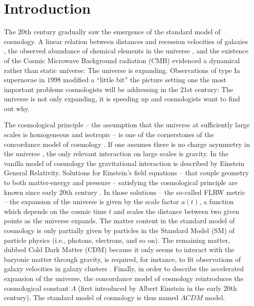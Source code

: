 \chapter*{Introduction}
\label{intro} 

The $20$th century gradually saw the emergence of the standard model of cosmology. A linear relation between distances and recession velocities of galaxies \cite{Hubble:1929ig}, the observed abundance of chemical elements in the universe , and the existence of the Cosmic Microwave Background radiation (CMB)  evidenced a dynamical rather than static universe: The universe is expanding. Observations of type Ia supernovae in $1998$  modified a ``little bit'' the picture setting one the most important problems cosmologists will be addressing in the $21$st century: The universe is not only expanding, it is speeding up and cosmologists want to find out why. 

The cosmological principle -- the assumption that the universe at sufficiently large scales is homogeneous and isotropic -- is one of the cornerstones of the concordance model of cosmology . If one assumes there is no charge asymmetry in the universe , the only relevant interaction on large scales is gravity. In the vanilla model of cosmology the gravitational interaction is described by Einstein General Relativity. Solutions for Einstein's field equations -- that couple geometry to both matter-energy and pressure -- satisfying the cosmological principle are known since early $20$th century . In those solutions -- the so-called FLRW metric -- the expansion of the universe is given by the scale factor $a(t)$, a function which depends on the cosmic time $t$ and scales the distance between two given points as the universe expands. The matter content in the standard model of cosmology is only partially given by particles in the Standard Model (SM) of particle physics (i.e., photons, electrons, and so on). The remaining matter, dubbed Cold Dark Matter (CDM) because it only seems to interact with the baryonic matter through gravity, is required, for instance, to fit observations of galaxy velocities in galaxy clusters . Finally, in order to describe the accelerated expansion of the universe, the concordance model of cosmology reintroduces the cosmological constant $\Lambda$ (first introduced by Albert Einstein in the early $20$th century). The standard model of cosmology is thus named  $\Lambda CDM$ model.

